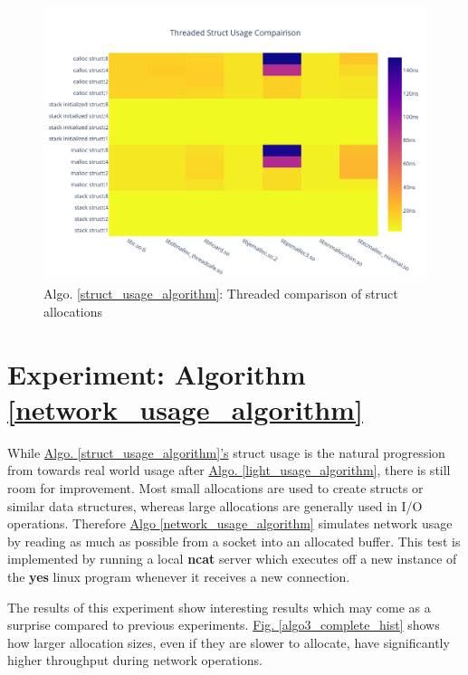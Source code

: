 \documentclass[letterpaper, 10 pt, conference]{ieeeconf}  %
\begin{document}
\begin{figure}[tbh!]
  \centering
  \includegraphics[width=\columnwidth]{graphs/struct_threaded_hist.png}
  \caption{ Algo. \ref{struct_usage_algorithm}: Threaded comparison of struct allocations }
  \label{algo2_complete_threaded_hist}
\end{figure}

\section{Experiment: Algorithm \ref*{network_usage_algorithm}}

While \hyperref[struct_usage_algorithm]{Algo. \ref*{struct_usage_algorithm}'s} struct usage is the natural progression from towards real world usage after \hyperref[light_usage_algorithm]{Algo. \ref{light_usage_algorithm}}, there is still room for improvement.
Most small allocations are used to create structs or similar data structures, whereas large allocations are generally used in I/O operations.
Therefore \hyperref[network_usage_algorithm]{Algo \ref*{network_usage_algorithm}} simulates network usage by reading as much as possible from a socket into an allocated buffer.
This test is implemented by running a local \textbf{ncat} server which executes off a new instance of the \textbf{yes} linux program whenever it receives a new connection.

The results of this experiment show interesting results which may come as a surprise compared to previous experiments.
\hyperref[algo3_complete_hist]{Fig. \ref*{algo3_complete_hist}} shows how larger allocation sizes, even if they are slower to allocate, have significantly higher throughput during network operations.
\end{document}
